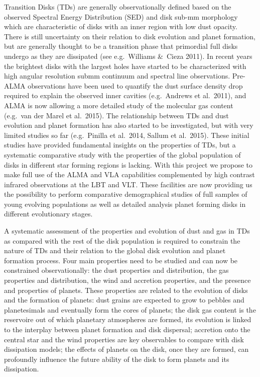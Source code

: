 \documentclass[10pt,fleqn,twoside]{article}
\begin{document}
Transition Disks (TDs) are generally observationally defined based on the observed Spectral Energy
Distribution (SED) and disk sub-mm morphology which are characteristic of disks with an inner region
with low dust opacity. There is still uncertainty on their relation 
to disk evolution and planet formation, but are generally thought to be a transition phase that
primordial full disks undergo as they are dissipated (see e.g.\ Williams \&\ Cieza 2011). In recent 
years the brightest disks with the largest holes have started to be characterized with high angular resolution submm continuum and spectral line observations. 
Pre-ALMA observations have been used to quantify the dust surface density drop required to 
explain the observed inner cavities (e.g.\ Andrews et al.~2011), and ALMA is now allowing a more 
detailed study of the molecular gas content (e.g.\ van der Marel et al.~2015). 
The relationship between TDs and dust evolution and planet formation has also started to be investigated,
but with very limited studies so far (e.g.\ Pinilla et al.~2014, Sallum et al.~2015).
These initial studies have provided fundamental insights on the properties of TDs, but a 
systematic comparative study with the properties of the global population of disks in different 
star forming regions is lacking. With this project we propose to make full use of the ALMA and VLA capabilities complemented by high contrast infrared observations at the LBT and VLT. These facilities 
are now providing us the possibility to perform comparative demographical studies of full samples of young evolving populations as well as detailed analysis planet forming disks in different evolutionary stages. 

A systematic assessment of the properties and evolution of dust and gas in TDs as compared with the rest of the disk population is required to constrain the nature of TDs and their relation to the global disk evolution and planet formation process. Four main properties need to be studied and can now be constrained 
observationally: the dust properties and distribution, the gas properties and distribution, the wind and accretion properties, and the presence and properties of planets. These properties are related to the evolution of disks and the formation of planets: dust grains are expected to grow to pebbles and planetesimals and eventually form the cores of planets; the disk gas content is the reservoire out of which planetary atmospheres are formed, its evolution is linked to the interplay between planet formation and disk dispersal; accretion onto the central star and the wind properties are key observables to compare with disk dissipation models; the effects of planets on the disk, once they are formed, can profoundly influence the future ability of the disk to form planets and its dissipation.
\end{document}
